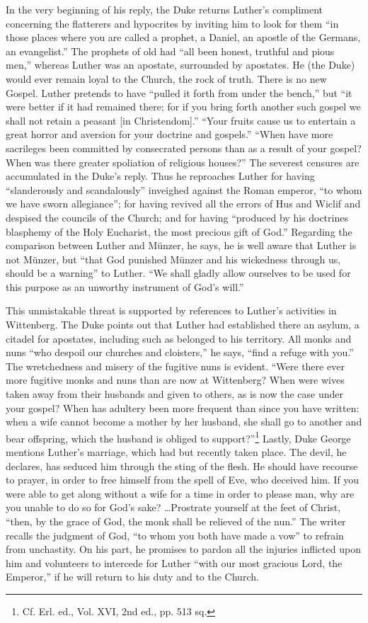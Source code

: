 In the very beginning of his reply, the Duke returns Luther’s compliment
concerning the flatterers and hypocrites by inviting him to look for them “in
those places where you are called a prophet, a Daniel, an apostle of the
Germans, an evangelist.” The prophets of old had “all been honest, truthful
and pious men,” whereas Luther was an apostate, surrounded by apostates. He
(the Duke) would ever remain loyal to the Church, the rock of truth.
There is no new Gospel. Luther pretends to have “pulled it forth from under
the bench,” but “it were better if it had remained there; for if you bring
forth another such gospel we shall not retain a peasant [in Christendom].”
“Your fruits cause us to entertain a great horror and aversion for your
doctrine and gospels.” “When have more sacrileges been committed by consecrated
persons than as a result of your gospel? When was there greater
spoliation of religious houses?” The severest censures are accumulated in the
Duke’s reply. Thus he reproaches Luther for having ``slanderously and
scandalously'' inveighed against the Roman emperor, “to whom we have
sworn allegiance”; for having revived all the errors of Hus and Wiclif and
despised the councils of the Church; and for having “produced by his doctrines
blasphemy of the Holy Eucharist, the most precious gift of
God.” Regarding the comparison between Luther and Münzer, he says, he
is well aware that Luther is not Münzer, but “that God punished Münzer
and his wickedness through us, should be a warning” to Luther. “We shall
gladly allow ourselves to be used for this purpose as an unworthy instrument
of God’s will.”

This unmistakable threat is supported by references to Luther’s activities
in Wittenberg. The Duke points out that Luther had established there an
asylum, a citadel for apostates, including such as belonged to his territory.
All monks and nuns “who despoil our churches and cloisters,” he says, “find
a refuge with you.” The wretchedness and misery of the fugitive nuns is
evident. “Were there ever more fugitive monks and nuns than are now at
Wittenberg? When were wives taken away from their husbands and given
to others, as is now the case under your gospel? When has adultery been
more frequent than since you have written: when a wife cannot become a
mother by her husband, she shall go to another and bear offspring, which the
husband is obliged to support?”\footnote{Cf. Erl. ed., Vol. XVI, 2nd ed., pp. 513 sq.}
Lastly, Duke George mentions Luther’s
marriage, which had but recently taken place. The devil, he declares, has
seduced him through the sting of the flesh. He should have recourse to prayer,
in order to free himself from the spell of Eve, who deceived him. If you
were able to get along without a wife for a time in order to please man,
why are you unable to do so for God’s sake? \dots Prostrate yourself at the
feet of Christ, “then, by the grace of God, the monk shall be relieved of the
nun.” The writer recalls the judgment of God, “to whom you both have
made a vow” to refrain from unchastity. On his part, he promises to pardon
all the injuries inflicted upon him and volunteers to intercede for Luther
“with our most gracious Lord, the Emperor,” if he will return to his duty
and to the Church.
